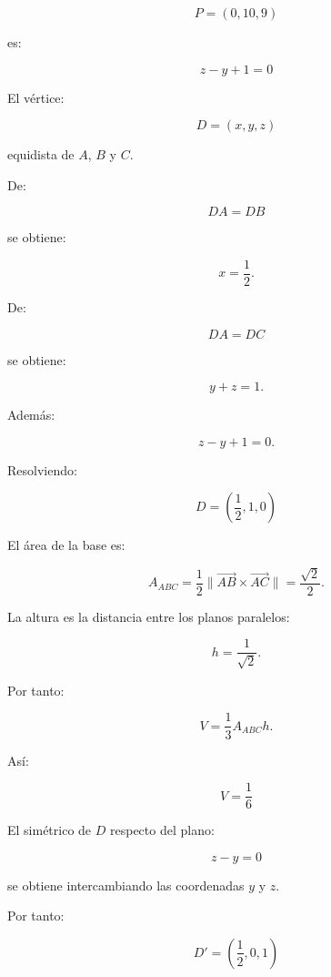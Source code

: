 \documentclass[11pt,a4paper]{article}
\begin{document}
\[
P=(0,10,9)
\]

es:

\[
\boxed{
z-y+1=0
}
\]

El vértice:

\[
D=(x,y,z)
\]

equidista de \(A\), \(B\) y \(C\).

De:

\[
DA=DB
\]

se obtiene:

\[
x=\frac12.
\]

De:

\[
DA=DC
\]

se obtiene:

\[
y+z=1.
\]

Además:

\[
z-y+1=0.
\]

Resolviendo:

\[
\boxed{
D=
\left(
\frac12,
1,
0
\right)
}
\]

El área de la base es:

\[
A_{ABC}
=
\frac12
\|
\overrightarrow{AB}\times\overrightarrow{AC}
\|
=
\frac{\sqrt2}{2}.
\]

La altura es la distancia entre los planos paralelos:

\[
h
=
\frac1{\sqrt2}.
\]

Por tanto:

\[
V
=
\frac13A_{ABC}h.
\]

Así:

\[
\boxed{
V=\frac16
}
\]

El simétrico de \(D\) respecto del plano:

\[
z-y=0
\]

se obtiene intercambiando las coordenadas \(y\) y \(z\).

Por tanto:

\[
\boxed{
D'
=
\left(
\frac12,
0,
1
\right)
}
\]
\end{document}
